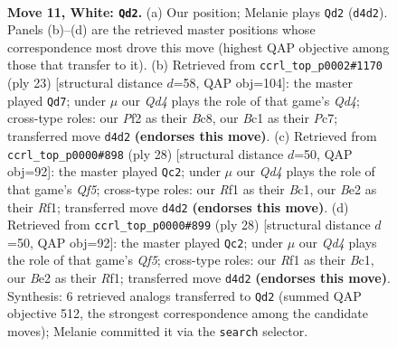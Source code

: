 \documentclass[11pt]{article}
\begin{document}
\clearpage

\begin{figure}[p]\centering
\begin{subfigure}{0.46\textwidth}\centering
\resizebox{\linewidth}{!}{%
\newchessgame
\chessboard[
  setfen={r1bq1rk1/ppp2pbp/3p2p1/7n/2PQP3/2N4P/PP2BPP1/R1B2RK1 w - - 1 11},
  showmover=false,
  pgfstyle=straightmove, color=movearrow, markmove={d4-d2}
]}
\caption{}
\end{subfigure}\hfill
\begin{subfigure}{0.46\textwidth}\centering
\resizebox{\linewidth}{!}{%
\newchessgame
\chessboard[
  setfen={r1b2rk1/1pp2pbp/p1n3p1/3qp1N1/1P6/3P2P1/P3PPBP/1RBQ1RK1 b - - 1 12},
  showmover=false,
  pgfstyle=straightmove, color=movearrow, markmove={d5-d7}
]}
\caption{}
\end{subfigure}
\\[4pt]
\begin{subfigure}{0.46\textwidth}\centering
\resizebox{\linewidth}{!}{%
\newchessgame
\chessboard[
  setfen={r1bqnrk1/p3bppp/1p1p4/2pP1Q2/8/2N3P1/PP2PPBP/R1B2RK1 w - - 2 15},
  showmover=false,
  pgfstyle=straightmove, color=movearrow, markmove={f5-c2}
]}
\caption{}
\end{subfigure}\hfill
\begin{subfigure}{0.46\textwidth}\centering
\resizebox{\linewidth}{!}{%
\newchessgame
\chessboard[
  setfen={r1bqnrk1/p3bppp/1p1p4/2pP1Q2/8/2N3P1/PP2PPBP/R1B2RK1 w - - 2 15},
  showmover=false,
  pgfstyle=straightmove, color=movearrow, markmove={f5-c2}
]}
\caption{}
\end{subfigure}
\caption{\textbf{Move 11, White: \texttt{Qd2}.} (a) Our position; Melanie plays \texttt{Qd2} (\texttt{d4d2}). Panels (b)--(d) are the retrieved master positions whose correspondence most drove this move (highest QAP objective among those that transfer to it). (b) Retrieved from \texttt{ccrl\_top\_p0002\#1170} (ply 23) [structural distance $d$=58, QAP obj=104]: the master played \texttt{Qd7}; under $\mu$ our \emph{Qd4} plays the role of that game's \emph{Qd4}; cross-type roles: our \emph{P}f2 as their \emph{B}c8, our \emph{B}c1 as their \emph{P}c7; transferred move \texttt{d4d2} \textbf{(endorses this move)}. (c) Retrieved from \texttt{ccrl\_top\_p0000\#898} (ply 28) [structural distance $d$=50, QAP obj=92]: the master played \texttt{Qc2}; under $\mu$ our \emph{Qd4} plays the role of that game's \emph{Qf5}; cross-type roles: our \emph{R}f1 as their \emph{B}c1, our \emph{B}e2 as their \emph{R}f1; transferred move \texttt{d4d2} \textbf{(endorses this move)}. (d) Retrieved from \texttt{ccrl\_top\_p0000\#899} (ply 28) [structural distance $d$=50, QAP obj=92]: the master played \texttt{Qc2}; under $\mu$ our \emph{Qd4} plays the role of that game's \emph{Qf5}; cross-type roles: our \emph{R}f1 as their \emph{B}c1, our \emph{B}e2 as their \emph{R}f1; transferred move \texttt{d4d2} \textbf{(endorses this move)}. Synthesis: 6 retrieved analogs transferred to \texttt{Qd2} (summed QAP objective 512, the strongest correspondence among the candidate moves); Melanie committed it via the \texttt{search} selector.}
\label{fig:thought-m20}
\end{figure}
\end{document}
